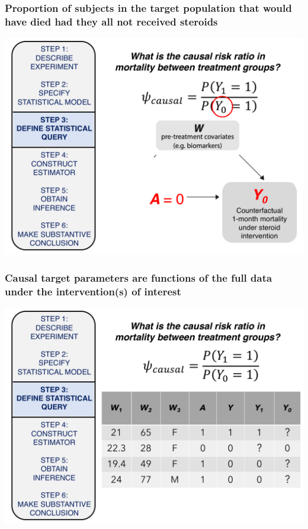 \documentclass[t]{beamer}
\begin{document}
\begin{frame}
  \frametitle{Proportion of subjects in the target population that would have died had they all not received steroids}
  \vspace{-20pt}
  \begin{center}
  \includegraphics[width = 1.05\textwidth]{figures/counterfactual_Y0.pdf}
  \end{center}
\end{frame}

\begin{frame}
  \frametitle{Causal target parameters are functions of the full data under the intervention(s) of interest}
  \vspace{-20pt}
  \begin{center}
  \includegraphics[width = 1.05\textwidth]{figures/causalRR_fulldata1.pdf}
  \end{center}
\end{frame}
\end{document}
